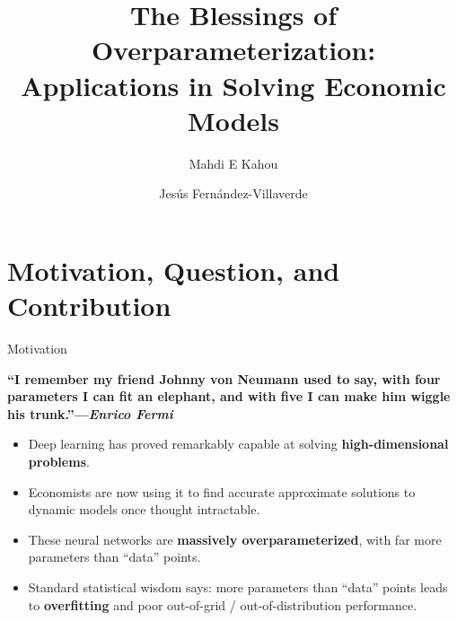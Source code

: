 \documentclass[aspectratio=169,10pt]{beamer}
\newcommand{\emphcolor}[1]{\textbf{\textcolor{emphcolorval}{#1}}}
\begin{document}
	
\title{{\vspace{0.4in}\hspace{0.2in}\textcolor{KahouBlack}{The Blessings of Overparameterization: \\ \hspace*{5mm}Applications in Solving Economic Models}}}
\author{\hspace*{4mm} Mahdi E Kahou \and
	Jes\'{u}s Fern\'{a}ndez-Villaverde}



\date{}

\maketitle

\section{\textcolor{KahouBlack}{Motivation, Question, and Contribution}}

\begin{frame}{Motivation}
	\begin{center}
		\emphcolor{``I remember my friend Johnny von Neumann used to say, with four parameters I can fit an elephant, and with five I can make him wiggle his trunk.''---{\it Enrico Fermi}}
		\vspace{0.1in}
	\end{center}
	\vspace{0.1in}
	\begin{itemize}
		\item Deep learning has proved remarkably capable at solving \emphcolor{high-dimensional problems}.
		\vspace{0.1in}
		\item Economists are now using it to find accurate approximate solutions to dynamic models once thought intractable.
		\vspace{0.1in}
		\item These neural networks are \emphcolor{massively overparameterized}, with far more parameters than ``data'' points.
		\vspace{0.1in}
		\item Standard statistical wisdom says: more parameters than ``data'' points leads to \emphcolor{overfitting} and poor out-of-grid / out-of-distribution performance.
	\end{itemize}
\end{frame}
\end{document}
